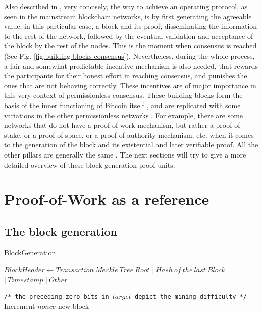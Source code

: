 \documentclass[journal]{IEEEtran}
\newcommand{\LineComment}[1]{\State \texttt{/* #1 */}}
\begin{document}
Also described in \cite{survey-dist-consensus}, very concisely, the 
way to achieve an operating protocol, as seen in the mainstream blockchain
networks, is by first generating the agreeable value, 
in this particular case, a block and its proof, disseminating the information 
to the rest of the network, followed by the eventual validation and 
acceptance of the block by the rest of the nodes. This is the moment when consensus is reached (See Fig. \ref{fig:building-blocks-consensus}).
Nevertheless, during the whole process, a fair and somewhat predictable incentive mechanism 
is also needed, that rewards the participants for their honest effort in reaching consensus, and
punishes the ones that are not behaving correctly. These incentives are of major importance
in this very context of permissionless consensus. 
These building blocks form the basis of the inner functioning of Bitcoin itself \cite{nakamoto2008bitcoin},
and are replicated with some variations in the other permissionless networks \cite{buterin2014next}.
For example, there are some networks that do not have a proof-of-work mechanism,
but rather a proof-of-stake, or a proof-of-space, or a proof-of-authority mechanism, etc.
when it comes to the generation of the block and its existential and later verifiable proof.
All the other pillars are generally the same \cite{survey-dist-consensus}.
The next sections will try to give a more detailed overview of these 
block generation proof units.

\section{Proof-of-Work as a reference}

\subsection{The block generation}

\begin{algorithm}
  \caption[short]{BlockGeneration}\label{alg:BlockGeneration}
  \begin{algorithmic}[1]
    \Function {}{}
      \State $Block Header \gets Transaction \ Merkle \ Tree \ Root$
      \Indent
        \State $| \ Hash \ of \ the \ last \ Block$
        \State $| \ Timestamp$
        \State $| \ Other$
      \EndIndent
      
      \LineComment{the preceding zero bits in $target$ depict the mining difficulty}
      \State Increment $nonce$
      \EndWhile
      \State \Return new block
    \EndFunction
  \end{algorithmic}
  \end{algorithm}
  
\end{document}
